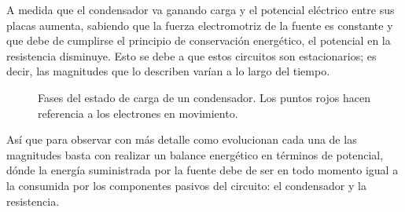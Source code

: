 \documentclass[../main.tex]{subfiles}
\begin{document}
A medida que el condensador va ganando carga y el potencial eléctrico entre sus placas aumenta, sabiendo que la fuerza electromotriz de la fuente es constante y que debe de cumplirse el principio de conservación energético, el potencial en la resistencia disminuye. Esto se debe a que estos circuitos son estacionarios; es decir, las magnitudes que lo describen varían a lo largo del tiempo.

\begin{figure}[!h]
    \centering
    \caption{Fases del estado de carga de un condensador. Los puntos rojos hacen referencia a los electrones en movimiento.}
    \label{fig::carga_condensador}
\end{figure}

Así que para observar con más detalle como evolucionan cada una de las magnitudes basta con realizar un balance energético en términos de potencial, dónde la energía suministrada por la fuente debe de ser en todo momento igual a la consumida por los componentes pasivos del circuito: el condensador y la resistencia.
\end{document}
